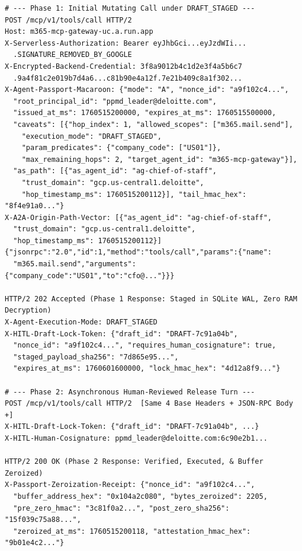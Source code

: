 \documentclass[conference,10pt]{IEEEtran}
\begin{document}
\vspace{2pt}
\vspace{-3pt}
\begin{lstlisting}[label={lst:wire_headers}]
# --- Phase 1: Initial Mutating Call under DRAFT_STAGED ---
POST /mcp/v1/tools/call HTTP/2
Host: m365-mcp-gateway-uc.a.run.app
X-Serverless-Authorization: Bearer eyJhbGci...eyJzdWIi...
  .SIGNATURE_REMOVED_BY_GOOGLE
X-Encrypted-Backend-Credential: 3f8a9012b4c1d2e3f4a5b6c7
  .9a4f81c2e019b7d4a6...c81b90e4a12f.7e21b409c8a1f302...
X-Agent-Passport-Macaroon: {"mode": "A", "nonce_id": "a9f102c4...",
  "root_principal_id": "ppmd_leader@deloitte.com",
  "issued_at_ms": 1760515200000, "expires_at_ms": 1760515500000,
  "caveats": [{"hop_index": 1, "allowed_scopes": ["m365.mail.send"],
    "execution_mode": "DRAFT_STAGED",
    "param_predicates": {"company_code": ["US01"]},
    "max_remaining_hops": 2, "target_agent_id": "m365-mcp-gateway"}],
  "as_path": [{"as_agent_id": "ag-chief-of-staff",
    "trust_domain": "gcp.us-central1.deloitte",
    "hop_timestamp_ms": 1760515200112}], "tail_hmac_hex": "8f4e91a0..."}
X-A2A-Origin-Path-Vector: [{"as_agent_id": "ag-chief-of-staff",
  "trust_domain": "gcp.us-central1.deloitte",
  "hop_timestamp_ms": 1760515200112}]
{"jsonrpc":"2.0","id":1,"method":"tools/call","params":{"name":
  "m365.mail.send","arguments":{"company_code":"US01","to":"cfo@..."}}}

HTTP/2 202 Accepted (Phase 1 Response: Staged in SQLite WAL, Zero RAM Decryption)
X-Agent-Execution-Mode: DRAFT_STAGED
X-HITL-Draft-Lock-Token: {"draft_id": "DRAFT-7c91a04b",
  "nonce_id": "a9f102c4...", "requires_human_cosignature": true,
  "staged_payload_sha256": "7d865e95...",
  "expires_at_ms": 1760601600000, "lock_hmac_hex": "4d12a8f9..."}

# --- Phase 2: Asynchronous Human-Reviewed Release Turn ---
POST /mcp/v1/tools/call HTTP/2  [Same 4 Base Headers + JSON-RPC Body +]
X-HITL-Draft-Lock-Token: {"draft_id": "DRAFT-7c91a04b", ...}
X-HITL-Human-Cosignature: ppmd_leader@deloitte.com:6c90e2b1...

HTTP/2 200 OK (Phase 2 Response: Verified, Executed, & Buffer Zeroized)
X-Passport-Zeroization-Receipt: {"nonce_id": "a9f102c4...",
  "buffer_address_hex": "0x104a2c080", "bytes_zeroized": 2205,
  "pre_zero_hmac": "3c81f0a2...", "post_zero_sha256": "15f039c75a88...",
  "zeroized_at_ms": 1760515200118, "attestation_hmac_hex": "9b01e4c2..."}
\end{lstlisting}
\end{document}
